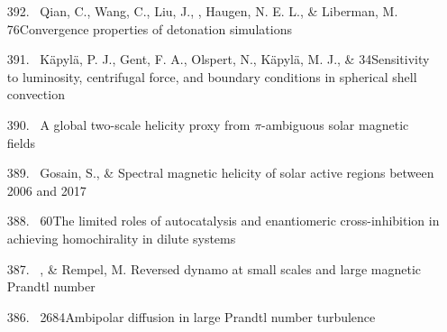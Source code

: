 \begin{itemize}
\item[{392.}~]
Qian, C., Wang, C., Liu, J., \Brandenburg, Haugen, N. E. L., \& Liberman, M.
{76}{Convergence properties of detonation simulations}

\item[{391.}~]
K\"apyl\"a, P. J., Gent, F. A., Olspert, N., K\"apyl\"a, M. J., \& \Brandenburg{}
{34}{Sensitivity to luminosity, centrifugal force, and boundary conditions in spherical shell convection}

\item[{390.}~]
\Brandenburg{}
{A global two-scale helicity proxy from $\pi$-ambiguous solar magnetic fields}

\item[{389.}~]
Gosain, S., \& \Brandenburg{}
{Spectral magnetic helicity of solar active regions between 2006 and 2017}

\item[{388.}~]
\Brandenburg{}
{60}{The limited roles of autocatalysis and enantiomeric cross-inhibition in achieving homochirality in dilute systems}

\item[{387.}~]
\Brandenburg, \& Rempel, M.
{Reversed dynamo at small scales and large magnetic Prandtl number}

\item[{386.}~]
\Brandenburg{}
{2684}{Ambipolar diffusion in large Prandtl number turbulence}


\end{itemize}
